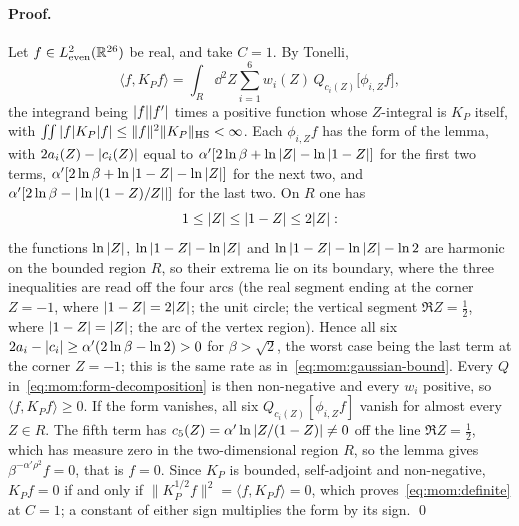 \paragraph{Proof.}
Let $f \in L^2_{\rm even}(\mathbb{R}^{26})$ be real, and take $C = 1$.
By Tonelli,
\begin{equation}
  \label{eq:mom:form-decomposition}
  \langle f, K_P f \rangle
    = \int_R \dd^2 Z \sum_{i = 1}^6 w_i(Z) \, Q_{c_i(Z)}\big[ \phi_{i, Z} f \big],
\end{equation}
the integrand being ${|f|} {|f'|}$ times a positive function whose $Z$-integral is $K_P$ itself, with $\iint {|f|} K_P {|f|} \le \|f\|^2 \|K_P\|_{\rm HS} < \infty$.
Each $\phi_{i, Z} f$ has the form of the lemma, with $2 a_i(Z) - {|c_i(Z)|}$ equal to $\alpha' [2 \ln \beta + \ln {|Z|} - \ln {|1 - Z|}]$ for the first two terms, $\alpha' [2 \ln \beta + \ln {|1 - Z|} - \ln {|Z|}]$ for the next two, and $\alpha' [2 \ln \beta - {|\ln {|(1 - Z) / Z|}|}]$ for the last two.
On $R$ one has
\begin{equation}
  \label{eq:mom:region}
  1
    \le {|Z|}
    \le {|1 - Z|}
    \le 2 {|Z|}:
\end{equation}
the functions $\ln {|Z|}$, $\ln {|1 - Z|} - \ln {|Z|}$ and $\ln {|1 - Z|} - \ln {|Z|} - \ln 2$ are harmonic on the bounded region $R$, so their extrema lie on its boundary, where the three inequalities are read off the four arcs (the real segment ending at the corner $Z = -1$, where ${|1 - Z|} = 2 {|Z|}$; the unit circle; the vertical segment $\Re Z = \tfrac{1}{2}$, where ${|1 - Z|} = {|Z|}$; the arc of the vertex region).
Hence all six $2 a_i - {|c_i|} \ge \alpha' (2 \ln \beta - \ln 2) > 0$ for $\beta > \sqrt{2}$, the worst case being the last term at the corner $Z = -1$; this is the same rate as in~\eqref{eq:mom:gaussian-bound}.
Every $Q$ in~\eqref{eq:mom:form-decomposition} is then non-negative and every $w_i$ positive, so $\langle f, K_P f \rangle \ge 0$.
If the form vanishes, all six $Q_{c_i(Z)}[\phi_{i, Z} f]$ vanish for almost every $Z \in R$.
The fifth term has $c_5(Z) = \alpha' \ln {|Z / (1 - Z)|} \ne 0$ off the line $\Re Z = \tfrac{1}{2}$, which has measure zero in the two-dimensional region $R$, so the lemma gives $\beta^{- \alpha' \rho^2} f = 0$, that is $f = 0$.
Since $K_P$ is bounded, self-adjoint and non-negative, $K_P f = 0$ if and only if $\|K_P^{1/2} f\|^2 = \langle f, K_P f \rangle = 0$, which proves~\eqref{eq:mom:definite} at $C = 1$; a constant of either sign multiplies the form by its sign. \qed

